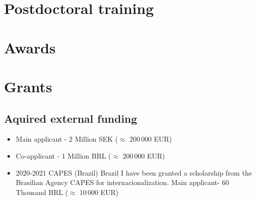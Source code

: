 \documentclass[10pt,A4]{article} %
\begin{document}
\section{Postdoctoral training} %

  

\section{Awards}

  

\section{Grants}
\subsection{Aquired external funding}

\begin{itemize}
    \item {} {\small Main applicant - 2 Million SEK ($\approx$ 200\,000 EUR)}

\item {} {\small Co-applicant - 1 Million BRL ($\approx$ 200\,000 EUR)}

    \item {}
    { 2020-2021 }
    { CAPES (Brazil) }
    { Brazil }
    { I have been granted a scholarship from the Brasilian Agency CAPES for internacionalization. } {\small Main applicant-  60 Thousand BRL ($\approx$ 10\,000 EUR) }
  \end{itemize}
\end{document}
